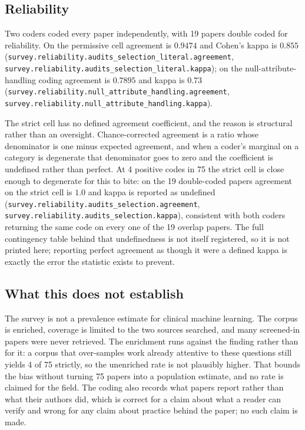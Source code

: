 \subsection{Reliability}

Two coders coded every paper independently, with 19 papers double coded for
reliability. On the permissive cell agreement is $0.9474$ and Cohen's kappa is
$0.855$ (\texttt{survey.reliability.audits\_selection\_literal.agreement},
\texttt{survey.reliability.audits\_selection\_literal.kappa}); on the
null-attribute-handling coding agreement is $0.7895$ and kappa is $0.73$
(\texttt{survey.reliability.null\_attribute\_handling.agreement},
\texttt{survey.reliability.null\_attribute\_handling.kappa}).

The strict cell has no defined agreement coefficient, and the reason is
structural rather than an oversight. Chance-corrected agreement
\citep{cohen1960kappa} is a ratio whose denominator is one minus expected
agreement, and when a coder's marginal on a category is degenerate that
denominator goes to zero and the coefficient is undefined rather than perfect. At
4 positive codes in 75 the strict cell is close enough to degenerate for this to
bite: on the 19 double-coded papers agreement on the strict cell is $1.0$ and
kappa is reported as undefined
(\texttt{survey.reliability.audits\_selection.agreement},
\texttt{survey.reliability.audits\_selection.kappa}), consistent with both
coders returning the same code on every one of the 19 overlap papers. The full
contingency table behind that undefinedness is not itself registered, so it is
not printed here; reporting perfect agreement as though it were a defined kappa
is exactly the error the statistic exists to prevent.

\subsection{What this does not establish}

The survey is not a prevalence estimate for clinical machine learning. The corpus
is enriched, coverage is limited to the two sources searched, and many
screened-in papers were never retrieved. The enrichment runs against the finding
rather than for it: a corpus that over-samples work already attentive to these
questions still yields 4 of 75 strictly, so the unenriched rate is not plausibly
higher. That bounds the bias without turning 75 papers into a population
estimate, and no rate is claimed for the field. The coding also records what
papers report rather than what their authors did, which is correct for a claim
about what a reader can verify and wrong for any claim about practice behind the
paper; no such claim is made.
